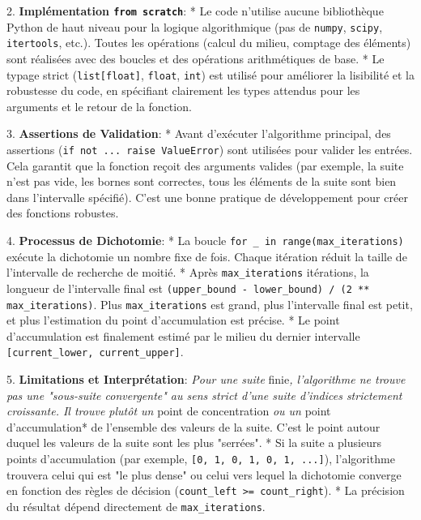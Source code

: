 \documentclass{report}
\begin{document}
2.  \textbf{Implémentation \texttt{from scratch}}:
    *   Le code n'utilise aucune bibliothèque Python de haut niveau pour la logique algorithmique (pas de \texttt{numpy}, \texttt{scipy}, \texttt{itertools}, etc.). Toutes les opérations (calcul du milieu, comptage des éléments) sont réalisées avec des boucles et des opérations arithmétiques de base.
    *   Le typage strict (\texttt{list[float]}, \texttt{float}, \texttt{int}) est utilisé pour améliorer la lisibilité et la robustesse du code, en spécifiant clairement les types attendus pour les arguments et le retour de la fonction.

3.  \textbf{Assertions de Validation}:
    *   Avant d'exécuter l'algorithme principal, des assertions (\texttt{if not ... raise ValueError}) sont utilisées pour valider les entrées. Cela garantit que la fonction reçoit des arguments valides (par exemple, la suite n'est pas vide, les bornes sont correctes, tous les éléments de la suite sont bien dans l'intervalle spécifié). C'est une bonne pratique de développement pour créer des fonctions robustes.

4.  \textbf{Processus de Dichotomie}:
    *   La boucle \texttt{for \_ in range(max\_iterations)} exécute la dichotomie un nombre fixe de fois. Chaque itération réduit la taille de l'intervalle de recherche de moitié.
    *   Après \texttt{max\_iterations} itérations, la longueur de l'intervalle final est \texttt{(upper\_bound - lower\_bound) / (2 ** max\_iterations)}. Plus \texttt{max\_iterations} est grand, plus l'intervalle final est petit, et plus l'estimation du point d'accumulation est précise.
    *   Le point d'accumulation est finalement estimé par le milieu du dernier intervalle \texttt{[current\_lower, current\_upper]}.

5.  \textbf{Limitations et Interprétation}:
    \textit{   Pour une suite }finie\textit{, l'algorithme ne trouve pas une "sous-suite convergente" au sens strict d'une suite d'indices strictement croissante. Il trouve plutôt un }point de concentration\textit{ ou un }point d'accumulation* de l'ensemble des valeurs de la suite. C'est le point autour duquel les valeurs de la suite sont les plus "serrées".
    *   Si la suite a plusieurs points d'accumulation (par exemple, \texttt{[0, 1, 0, 1, 0, 1, ...]}), l'algorithme trouvera celui qui est "le plus dense" ou celui vers lequel la dichotomie converge en fonction des règles de décision (\texttt{count\_left >= count\_right}).
    *   La précision du résultat dépend directement de \texttt{max\_iterations}.
\end{document}
